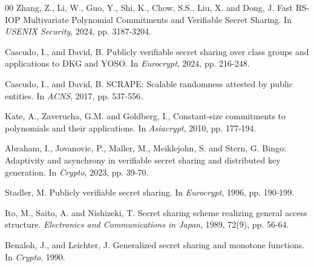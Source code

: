 \documentclass[runningheads]{llncs}
\begin{document}
\begin{thebibliography}{00}
Zhang, Z., Li, W., Guo, Y., Shi, K., Chow, S.S., Liu, X. and Dong, J. Fast {RS-IOP} Multivariate Polynomial Commitments and Verifiable Secret Sharing. In \textit{USENIX Security}, 2024, pp. 3187-3204.

 Cascudo, I., and David, B. Publicly verifiable secret sharing over class groups and applications to DKG and YOSO. In \textit{Eurocrypt}, 2024, pp. 216-248.

 Cascudo, I., and David, B. SCRAPE: Scalable randomness attested by public entities. In \textit{ACNS}, 2017, pp. 537-556.



Kate, A., Zaverucha, G.M. and Goldberg, I., Constant-size commitments to polynomials and their applications. In \textit{Asiacrypt}, 2010, pp. 177-194.

Abraham, I., Jovanovic, P., Maller, M., Meiklejohn, S. and Stern, G. Bingo: Adaptivity and asynchrony in verifiable secret sharing and distributed key generation. In \textit{Crypto}, 2023, pp. 39-70.


 Stadler, M. Publicly verifiable secret sharing. In \textit{Eurocrypt}, 1996, pp. 190-199.

Ito, M., Saito, A. and Nishizeki, T. Secret sharing scheme realizing general access structure. \textit{Electronics and Communications in Japan}, 1989, 72(9), pp. 56-64.

 Benaloh, J., and Leichter, J. Generalized secret sharing and monotone functions. In \textit{Crypto}, 1990.




\end{thebibliography}
\end{document}
